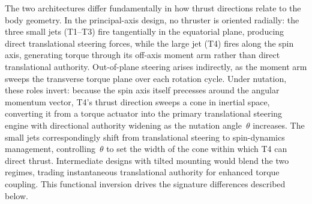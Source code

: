 \documentclass{article}
\begin{document}
The two architectures differ fundamentally in how thrust directions relate to
the body geometry. In the principal-axis design, no thruster is oriented
radially: the three small jets (T1--T3) fire tangentially in the equatorial
plane, producing direct translational steering forces, while the large jet
(T4) fires along the spin axis, generating torque through its off-axis moment
arm rather than direct translational authority. Out-of-plane steering arises
indirectly, as the moment arm sweeps the transverse torque plane over each
rotation cycle. Under nutation, these roles invert: because the spin axis
itself precesses around the angular momentum vector, T4's thrust direction
sweeps a cone in inertial space, converting it from a torque actuator into the
primary translational steering engine with directional authority widening as
the nutation angle~$\theta$ increases. The small jets correspondingly shift
from translational steering to spin-dynamics management, controlling~$\theta$
to set the width of the cone within which T4 can direct thrust. Intermediate
designs with tilted mounting would blend the two regimes, trading
instantaneous translational authority for enhanced torque coupling. This
functional inversion drives the signature differences described below.
\end{document}
